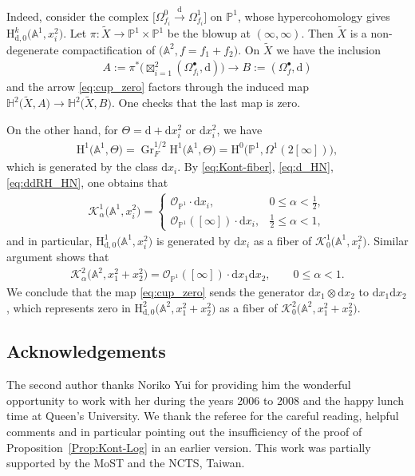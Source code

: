 \documentclass[pdftex]{sigma}
\renewcommand{\AA}{\mathbb{A}}
\newcommand{\HH}{\mathbb{H}}
\newcommand{\PP}{\mathbb{P}}
\newcommand{\sK}{\mathscr{K}}
\newcommand{\sO}{\mathscr{O}}
\newcommand{\de}{\mathrm{d}}
\newcommand{\coH}{\mathrm{H}}
\newcommand{\ddRH}{\Theta}
\newcommand{\cpt}{compactification}
\newcommand{\Gr}{\operatorname{Gr}}
\begin{document}
Indeed, consider the complex $\big[\Omega_{f_i}^0 \xrightarrow{\de} \Omega_{f_i}^1\big]$ on $\PP^1$, whose hypercohomology gives $\coH_{\de,0}^k\big(\AA^1,x_i^2\big)$. Let $\pi\colon \widetilde{X} \to \PP^1\times\PP^1$ be the blowup at $(\infty,\infty)$. Then $\widetilde{X}$ is a non-degenerate {\cpt} of $\big(\AA^2, f=f_1+f_2\big)$. On $\widetilde{X}$ we have the inclusion
\begin{gather*} A:= \pi^*\big(\boxtimes_{i=1}^2 (\Omega_{f_i}^\bullet,\de) \big) \to B:= (\Omega_f^\bullet, \de) \end{gather*}
and the arrow \eqref{eq:cup_zero} factors through the induced map $\HH^2\big(\widetilde{X}, A\big) \to \HH^2\big(\widetilde{X}, B\big)$. One checks that the last map is zero.

On the other hand, for $\ddRH = \de + \de x_i^2$ or $\de x_i^2$, we have
\begin{gather*} \coH^1\big(\AA^1, \ddRH\big) = \Gr_F^{1/2} \coH^1\big(\AA^1, \ddRH\big) = \coH^0\big(\PP^1, \Omega^1(2[\infty])\big), \end{gather*}
which is generated by the class $\de x_i$. By \eqref{eq:Kont-fiber}, \eqref{eq:d_HN}, \eqref{eq:ddRH_HN}, one obtains that
\begin{gather*} \sK^1_\alpha\big(\AA^1,x_i^2\big) = \begin{cases}
\sO_{\PP^1}\cdot\de x_i, & 0\leq \alpha < \frac{1}{2}, \\
\sO_{\PP^1}([\infty])\cdot\de x_i, & \frac{1}{2}\leq \alpha <1,
\end{cases} \end{gather*}
and in particular, $\coH_{\de,0}^1\big(\AA^1,x_i^2\big)$ is generated by $\de x_i$ as a fiber of $\sK^1_0\big(\AA^1,x_i^2\big)$. Similar argument shows that
\begin{gather*} \sK^2_\alpha\big(\AA^2,x_1^2+x_2^2\big) = \sO_{\PP^1}([\infty])\cdot\de x_1\de x_2, \qquad 0\leq \alpha <1. \end{gather*}
We conclude that the map \eqref{eq:cup_zero} sends the generator $\de x_1\otimes \de x_2$ to $\de x_1\de x_2$, which represents zero in $\coH_{\de,0}^2\big(\AA^2,x_1^2+x_2^2\big)$ as a fiber of $\sK^2_0\big(\AA^2,x_1^2+x_2^2\big)$.

\subsection*{Acknowledgements}

The second author thanks Noriko Yui for providing him the wonderful opportunity to work with her during the years 2006 to 2008 and the happy lunch time at Queen's University. We thank the referee for the careful reading,
helpful comments and in particular pointing out the insufficiency of the proof of Proposition~\ref{Prop:Kont-Log} in an earlier version. This work was partially supported by the MoST and the NCTS, Taiwan.
\end{document}
